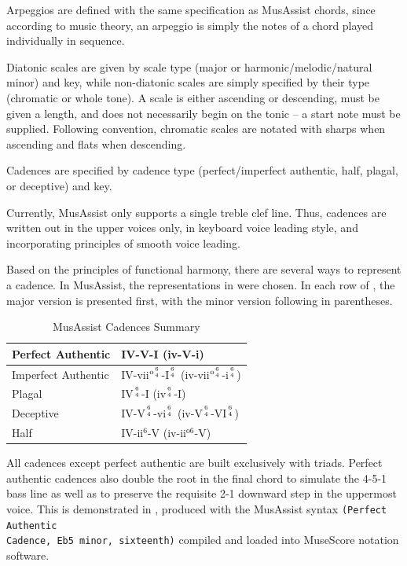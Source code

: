 \documentclass{article}
\begin{document}
Arpeggios are defined with the same specification as MusAssist chords, since according to music theory, an arpeggio is simply the notes of a chord played individually in sequence.

Diatonic scales are given by scale type (major or harmonic/melodic/natural minor) and key, while non-diatonic scales are simply specified by their type (chromatic or whole tone). A scale is either ascending or descending, must be given a length, and does not necessarily begin on the tonic – a start note must be supplied. Following convention, chromatic scales are notated with sharps when ascending and flats when descending.

Cadences are specified by cadence type (perfect/imperfect authentic, half, plagal, or deceptive) and key.

Currently, MusAssist only supports a single treble clef line. Thus, cadences are written out in the upper voices only, in keyboard voice leading style, and incorporating principles of smooth voice leading.

Based on the principles of functional harmony, there are several ways to represent a cadence. In MusAssist, the representations in  were chosen. In each row of , the major version is presented first, with the minor version following in parentheses.

\begin{table}[h!]
\centering
      \renewcommand{\arraystretch}{1.5}
\begin{tabular}{|l|l|}
\hline
Perfect Authentic & IV-V-I (iv-V-i) \\ \hline
Imperfect Authentic & IV-vii$^{\text{o}{6 \atop 4}}$-I$^{6 \atop 4}$ (iv-vii$^{\text{o}{6 \atop 4}}$-i$^{6 \atop 4}$) \\ \hline
Plagal & IV$^{6 \atop 4}$-I (iv$^{6 \atop 4}$-I) \\ \hline
Deceptive & IV-V$^{6 \atop 4}$-vi$^{6 \atop 4}$ (iv-V$^{6 \atop 4}$-VI$^{6 \atop 4}$) \\ \hline
Half & IV-ii$^6$-V (iv-ii$^{\text{o}6}$-V) \\ \hline
\end{tabular}
\caption{MusAssist Cadences Summary}\label{table:cadences}
\vspace{-5mm}
\end{table}

All cadences except perfect authentic are built exclusively with triads. Perfect authentic cadences also double the root in the final chord to simulate the 4-5-1 bass line as well as to preserve the requisite 2-1 downward step in the uppermost voice. This is demonstrated in , produced with the MusAssist syntax
 \verb!(Perfect Authentic!\\ \verb!Cadence, Eb5 minor, sixteenth)! compiled and loaded into MuseScore notation software.
\end{document}
